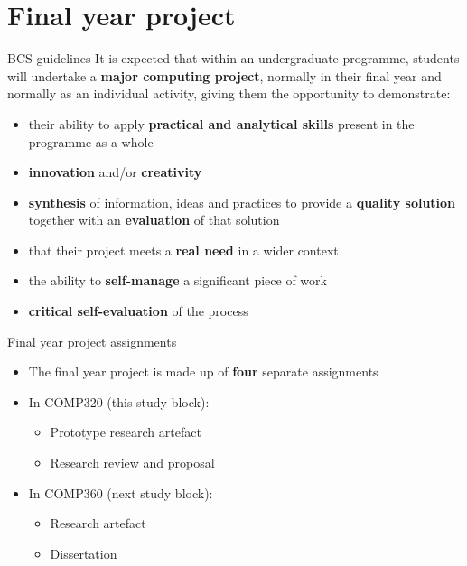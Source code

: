\part{Final year project}
\frame{\partpage}

\begin{frame}{BCS guidelines}
	It is expected that within an undergraduate programme, students will undertake a \textbf{major computing project}, normally in
	their final year and normally as an individual activity, giving them the opportunity to demonstrate:

	\begin{itemize}
		\pause\item their ability to apply \textbf{practical and analytical skills} present in the programme as a whole
		\pause\item \textbf{innovation} and/or \textbf{creativity}
		\pause\item \textbf{synthesis} of information, ideas and practices to provide a \textbf{quality solution} together with an \textbf{evaluation} of that solution
		\pause\item that their project meets a \textbf{real need} in a wider context
		\pause\item the ability to \textbf{self-manage} a significant piece of work
		\pause\item \textbf{critical self-evaluation} of the process
	\end{itemize}
\end{frame}

\begin{frame}{Final year project assignments}
	\begin{itemize}
		\pause\item The final year project is made up of \textbf{four} separate assignments
		\pause\item In COMP320 (this study block):
		\begin{itemize}
			\item Prototype research artefact
			\item Research review and proposal
		\end{itemize}
		\pause\item In COMP360 (next study block):
		\begin{itemize}
			\item Research artefact
			\item Dissertation
		\end{itemize}
	\end{itemize}
\end{frame}


